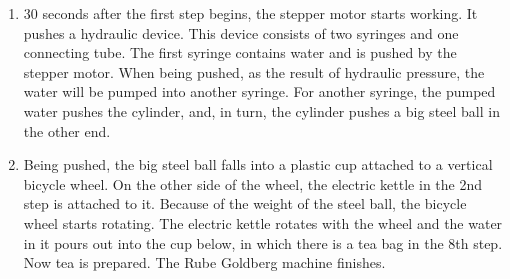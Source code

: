 \documentclass[twoside,a4paper]{refart}
\begin{document}
\begin{enumerate}
			\item 30 seconds after the first step begins, the stepper motor starts working. It pushes a hydraulic device. This device consists of two syringes and one connecting tube. The first syringe contains water and is pushed by the stepper motor. When being pushed, as the result of hydraulic pressure, the water will be pumped into another syringe. For another syringe, the pumped water pushes the cylinder, and, in turn, the cylinder pushes a big steel ball in the other end.
			\item Being pushed, the big steel ball falls into a plastic cup attached to a vertical bicycle wheel. On the other side of the wheel, the electric kettle in the 2nd step is attached to it. Because of the weight of the steel ball, the bicycle wheel starts rotating. The electric kettle rotates with the wheel and the water in it pours out into the cup below, in which there is a tea bag in the 8th step. Now tea is prepared. The Rube Goldberg machine finishes.
			
		\end{enumerate}
\end{document}
